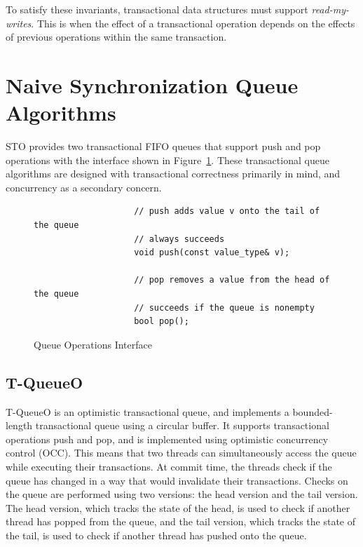 \noindent
To satisfy these invariants, transactional data structures must support \emph{read-my-writes}. This is when the effect of a transactional operation depends on the effects of previous operations within the same transaction.

\section{Naive Synchronization Queue Algorithms}

STO provides two transactional FIFO queues that support push and pop operations with the interface shown in Figure~\ref{fig:q_interface}. These transactional queue algorithms are designed with transactional correctness primarily in mind, and concurrency as a secondary concern. 

\begin{figure}[t]
    \centering
    \begin{lstlisting}
                    // push adds value v onto the tail of the queue
                    // always succeeds
                    void push(const value_type& v); 
                   
                    // pop removes a value from the head of the queue
                    // succeeds if the queue is nonempty 
                    bool pop();                     
    \end{lstlisting}
    \caption{Queue Operations Interface}
    \label{fig:q_interface}
\end{figure}

\subsection{T-QueueO}
T-QueueO is an optimistic transactional queue, and implements a bounded-length transactional queue using a circular buffer.
It supports transactional operations push and pop, and is implemented using optimistic concurrency control (OCC). This means that two threads can simultaneously access the queue while executing their transactions. At commit time, the threads check if the queue has changed in a way that would invalidate their transactions. Checks on the queue are performed using two versions: the head version and the tail version. The head version, which tracks the state of the head, is used to check if another thread has popped from the queue, and the tail version, which tracks the state of the tail, is used to check if another thread has pushed onto the queue.

